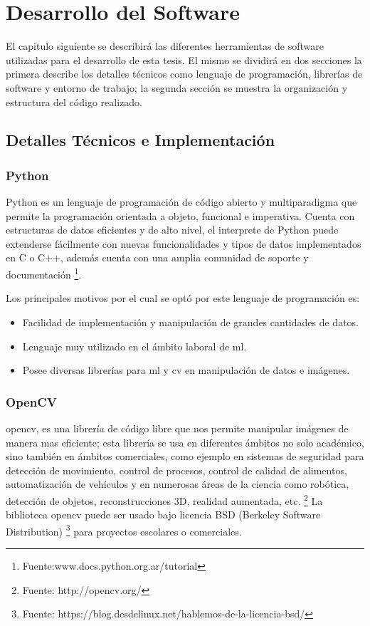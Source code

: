 \section{Desarrollo del Software}\label{sec:Desarrollo}

El capitulo siguiente se describirá las diferentes herramientas de software utilizadas para el desarrollo de esta tesis. El mismo se dividirá en dos secciones la primera describe los detalles técnicos como lenguaje de programación, librerías de software y entorno de trabajo; la segunda sección se muestra la organización y estructura del código realizado.


\subsection{Detalles Técnicos e Implementación}\label{sec:implementacion}

\subsubsection*{Python}
Python es un lenguaje de programación de código abierto y multiparadigma que permite la programación orientada a objeto, funcional e imperativa. 
Cuenta con estructuras de datos eficientes y de alto nivel, el interprete de Python puede extenderse fácilmente  con nuevas funcionalidades y tipos 
de  datos implementados en C o C++, además cuenta con una amplia comunidad de soporte y 
documentación \footnote{Fuente:www.docs.python.org.ar/tutorial}. 

Los principales motivos por el cual se optó por este lenguaje de programación es:
\begin{itemize}
 \item Facilidad de implementación y manipulación de grandes cantidades de datos.
 \item Lenguaje muy utilizado en el ámbito laboral de \ac{ml}.
 \item Posee diversas librerías para \ac{ml} y \ac{cv} en manipulación de datos e imágenes.
\end{itemize}


\subsubsection*{OpenCV}
\ac{opencv}, es una librería de código libre que nos permite manipular imágenes de manera mas eficiente; esta librería se usa en diferentes ámbitos no solo académico, sino también en ámbitos comerciales, como ejemplo en sistemas de seguridad para detección de movimiento, control de procesos, control de calidad de alimentos, automatización de vehículos y en numerosas áreas de la ciencia como robótica, detección de objetos, reconstrucciones 3D, realidad aumentada, etc. \footnote{Fuente: http://opencv.org/} La biblioteca \ac{opencv} puede ser usado bajo licencia BSD (Berkeley Software Distribution) \footnote{Fuente: https://blog.desdelinux.net/hablemos-de-la-licencia-bsd/ } para proyectos escolares o comerciales. 

